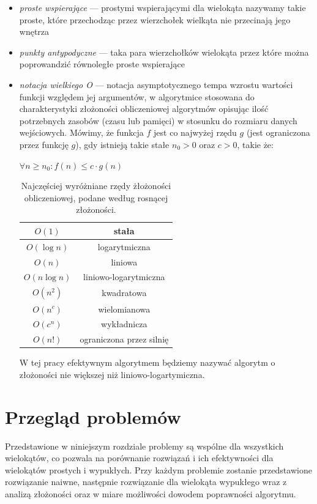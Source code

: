 \documentclass[11pt,oneside,brudnopis]{xelatex-mgr/xmgr}
\begin{document}
\begin{itemize}
\item{\emph{proste wspierające}} --- prostymi wspierającymi dla wielokąta
  nazywamy takie proste, które przechodząc przez wierzchołek wielkąta
  nie przecinają jego wnętrza

\item{\emph{punkty antypodyczne}} --- taka para wierzchołków wielokąta przez
  które można poprowandzić równoległe proste wspierające

\item{\emph{notacja wielkiego O}} --- notacja asymptotycznego tempa
  wzrostu wartości funkcji względem jej argumentów, w algorytmice
  stosowana do charakterystyki złożoności obliczeniowej algorytmów
  opisując ilość potrzebnych zasobów (czasu lub pamięci) w stosunku do
  rozmiaru danych wejściowych. Mówimy, że funkcja $f$ jest co najwyżej
  rzędu $g$ (jest ograniczona przez funkcję $g$), gdy istnieją takie
  stałe $n_0 > 0$ oraz $c > 0$, takie że:

  \begin{center}
    $\forall n \geq n_0 : f(n) \leq c \cdot g(n)$
  \end{center}

  \begin{table}[htp]
    \centering
    \caption{Najczęściej wyróżniane rzędy żłożoności obliczeniowej,
      podane według rosnącej złożoności.}
    \begin{tabular}{c c}
      $O(1)$ & stała \\
      \hline
      $O(\log n)$ & logarytmiczna \\
      \hline
      $O(n)$ & liniowa \\
      \hline
      $O(n \log n)$ & liniowo-logarytmiczna \\
      \hline
      $O(n^2)$ & kwadratowa \\
      \hline
      $O(n^c)$ & wielomianowa \\
      \hline
      $O(c^n)$ & wykładnicza \\
      \hline
      $O(n!)$ & ograniczona przez silnię \\
    \end{tabular}
  \end{table}

  W tej pracy efektywnym algorytmem będziemy nazywać algorytm o
  złożoności nie większej niż liniowo-logartymiczna.
\end{itemize}

\chapter{Przegląd problemów}
Przedstawione w niniejszym rozdziale problemy są wspólne dla
wszystkich wielokątów, co pozwala na porównanie rozwiązań i ich
efektywności dla wielokątów prostych i wypukłych. Przy każdym
problemie zostanie przedstawione rozwiązanie naiwne, następnie
rozwiązanie dla wielokąta wypukłego wraz z analizą złożoności oraz
w miare możliwości dowodem poprawności algorytmu.
\end{document}
